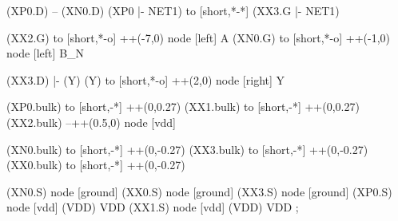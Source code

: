 \begin{circuitikz}[american]
	(XP0.D) -- (XN0.D)
	(XP0 |- NET1) to [short,*-*] (XX3.G |- NET1)
	
	(XX2.G) to [short,*-o] ++(-7,0) node [left] {A}
	(XN0.G) to [short,*-o] ++(-1,0) node [left] {B\_N}
	
	(XX3.D) |- (Y)
	(Y) to [short,*-o] ++(2,0) node [right] {Y}
	
	(XP0.bulk) to [short,-*] ++(0,0.27)
	(XX1.bulk) to [short,-*] ++(0,0.27)
	(XX2.bulk) --++(0.5,0) node [vdd] {}
	
	(XN0.bulk) to [short,-*] ++(0,-0.27)
	(XX3.bulk) to [short,-*] ++(0,-0.27)
	(XX0.bulk) to [short,-*] ++(0,-0.27)
	

	(XN0.S) node [ground] {}
	(XX0.S) node [ground] {}
	(XX3.S) node [ground] {}
	(XP0.S) node [vdd] (VDD) {VDD}
	(XX1.S) node [vdd] (VDD) {VDD}
;

\end{circuitikz}
